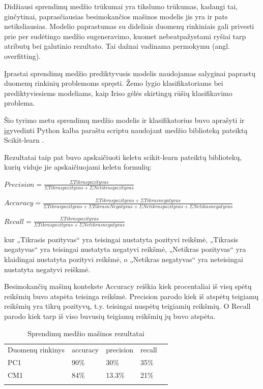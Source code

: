 \documentclass{VUMIFPSbakalaurinis}
\begin{document}
Didžiausi sprendimų medžio trūkumai yra tikslumo trūkumas, kadangi tai, ginčytinai, paprasčiausias besimokančios mašinos modelis jis yra ir pats netiksliausias. Modelio paprastumas su dideliais duomenų rinkiniais gali privesti prie per sudėtingo medžio sugeneravimo, kuomet nebeatpažystami ryšiai tarp atributų bei galutinio rezultato. Tai dažnai vadinama permokymu (angl. overfitting).

Įprastai sprendimų medžio prediktyvusis modelis naudojamas salyginai paprastų duomenų rinkinių problemoms spręsti. Žemo lygio klasifikatoriams bei prediktyviesiems modeliams, kaip Iriso gėlės skirtingų rūšių klasifikavimo problema.

Šio tyrimo metu sprendimų medžio modelis ir klasifikatorius buvo aprašyti ir įgyvedinti Python kalba paraštu scriptu naudojant medžio biblioteką pateiktą Scikit-learn \cite{scikit-learn}.

Rezultatai taip pat buvo apskaičiuoti keletu scikit-learn pateiktų bibliotekų, kurių viduje jie apskaičiuojami keletu formulių:
\begin{description} 
\item \(Precision = \frac{\Sigma Tikras pozityvas}{\Sigma Tikras pozityvas + \Sigma Netikras pozityvas}\)
\item \(Accuracy = \frac{\Sigma Tikras pozityvas + \Sigma Tikras negatyvas}{\Sigma Tikras pozityvas  + \Sigma Tikras nNegatyvas + \Sigma Netikras pozityvas + \Sigma Netikas negatyvas}\)
\item \(Recall = \frac{\Sigma Tikras pozityvas}{\Sigma Tikras pozityvas + \Sigma Netikras negatyvas}\)
\end{description}
kur „Tikrasis pozityvas“ yra teisingai nustatyta pozityvi reikšmė, „Tikrasis negatyvas“ yra teisingai nustatyta negatyvi reikšmė, „Netikras pozityvas“ yra klaidingai nustatyta pozityvi reikšmė, o „Netikras negatyvas“ yra neteisingai nustatyta negatyvi reiškmė.

Besimokančių mašinų kontekste Accuracy reiškia kiek procentaliai iš visų spėtų reikšmių buvo atspėta teisinga reikšmė. Precision parodo kiek iš atspėtų teigiamų reikšmių yra tikrų pozityvų, t.y. teisingai nuspėtų teigiamių reikšmių. O Recall parodo kiek tarp iš viso buvusių teigiamų reikšmių jų buvo atspėta.

\begin{table}[H]\footnotesize
\centering
\caption{Sprendimų medžio mašinos rezultatai}
\label{tab:Tree_result}
\begin{tabular}{lllll}
\cline{1-4}
\multicolumn{1}{|l}{Duomenų rinkinys} & accuracy & precision & \multicolumn{1}{l|}{recall} &  \\ \cline{1-4}
\multicolumn{1}{|l}{PC1}              & 90\%   & 30\%     & \multicolumn{1}{l|}{35\%} &  \\
\multicolumn{1}{|l}{CM1}              & 84\%    & 13.3\%     & \multicolumn{1}{l|}{21\%}  &  \\ \cline{1-4}
                                      &          &           &                             & 
\end{tabular}
\end{table}
\end{document}
